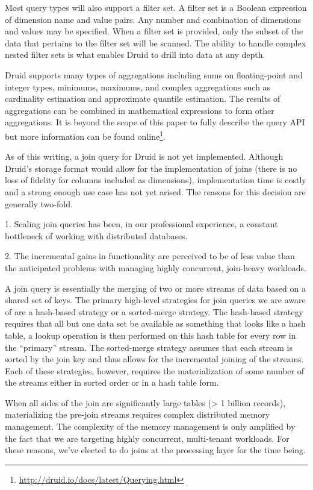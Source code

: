 \documentclass{vldb}
\begin{document}
{Most query types will also support a filter set. A filter set is a Boolean
expression of dimension name and value pairs. Any number and combination of
dimensions and values may be specified. When a filter set is provided, only the
subset of the data that pertains to the filter set will be scanned. The ability
to handle complex nested filter sets is what enables Druid to drill into data
at any depth. 

Druid supports many types of aggregations including sums on floating-point and
integer types, minimums, maximums, and complex aggregations such as cardinality
estimation and approximate quantile estimation. The results of aggregations can
be combined in mathematical expressions to form other aggregations. It is
beyond the scope of this paper to fully describe the query API but more
information can be found
online\footnote{\href{http://druid.io/docs/latest/Querying.html}{http://druid.io/docs/latest/Querying.html}}. 

As of this writing, a join query for Druid is not yet implemented.  Although
Druid’s storage format would allow for the implementation of joins (there is no
loss of fidelity for columns included as dimensions), implementation time is
costly and a strong enough use case has not yet arised. The reasons for this
decision are generally two-fold. 

1. Scaling join queries has been, in our professional experience, a constant
bottleneck of working with distributed databases. 

2. The incremental gains in functionality are perceived to be of less value
than the anticipated problems with managing highly concurrent, join-heavy
workloads. 

A join query is essentially the merging of two or more streams of data based on
a shared set of keys. The primary high-level strategies for join queries we are
aware of are a hash-based strategy or a sorted-merge strategy. The hash-based
strategy requires that all but one data set be available as something that
looks like a hash table, a lookup operation is then performed on this hash
table for every row in the “primary” stream. The sorted-merge strategy assumes
that each stream is sorted by the join key and thus allows for the incremental
joining of the streams. Each of these strategies, however, requires the
materialization of some number of the streams either in sorted order or in a
hash table form.

When all sides of the join are significantly large tables (> 1 billion
records), materializing the pre-join streams requires complex distributed
memory management. The complexity of the memory management is only amplified by
the fact that we are targeting highly concurrent, multi-tenant workloads. For
these reasons, we’ve elected to do joins at the processing layer for the time
being.

}
\end{document}
